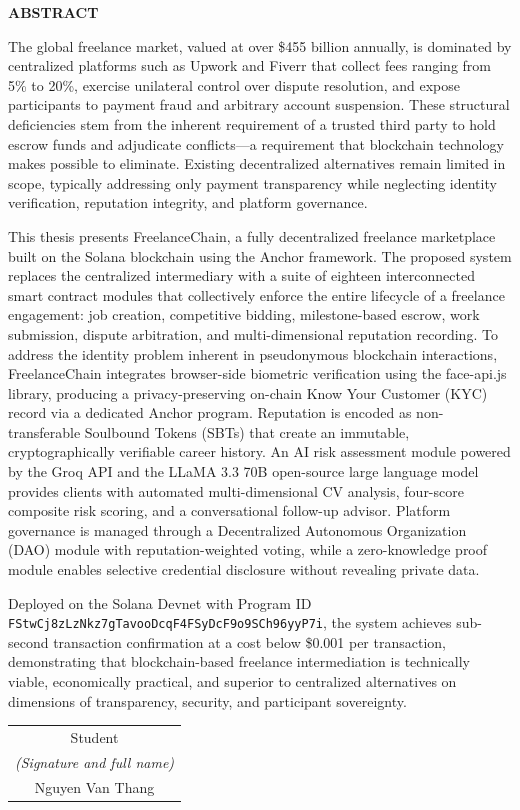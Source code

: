 \begin{center}
    \Large{\textbf{ABSTRACT}}
\end{center}
\vspace{1cm}

The global freelance market, valued at over \$455 billion annually, is dominated by centralized platforms such as Upwork and Fiverr that collect fees ranging from 5\% to 20\%, exercise unilateral control over dispute resolution, and expose participants to payment fraud and arbitrary account suspension. These structural deficiencies stem from the inherent requirement of a trusted third party to hold escrow funds and adjudicate conflicts---a requirement that blockchain technology makes possible to eliminate. Existing decentralized alternatives remain limited in scope, typically addressing only payment transparency while neglecting identity verification, reputation integrity, and platform governance.

This thesis presents FreelanceChain, a fully decentralized freelance marketplace built on the Solana blockchain using the Anchor framework. The proposed system replaces the centralized intermediary with a suite of eighteen interconnected smart contract modules that collectively enforce the entire lifecycle of a freelance engagement: job creation, competitive bidding, milestone-based escrow, work submission, dispute arbitration, and multi-dimensional reputation recording. To address the identity problem inherent in pseudonymous blockchain interactions, FreelanceChain integrates browser-side biometric verification using the face-api.js library, producing a privacy-preserving on-chain Know Your Customer (KYC) record via a dedicated Anchor program. Reputation is encoded as non-transferable Soulbound Tokens (SBTs) that create an immutable, cryptographically verifiable career history. An AI risk assessment module powered by the Groq API and the LLaMA 3.3 70B open-source large language model provides clients with automated multi-dimensional CV analysis, four-score composite risk scoring, and a conversational follow-up advisor. Platform governance is managed through a Decentralized Autonomous Organization (DAO) module with reputation-weighted voting, while a zero-knowledge proof module enables selective credential disclosure without revealing private data.

Deployed on the Solana Devnet with Program ID \texttt{FStwCj8zLzNkz7gTavooDcqF4FSyDcF9o9SCh96yyP7i}, the system achieves sub-second transaction confirmation at a cost below \$0.001 per transaction, demonstrating that blockchain-based freelance intermediation is technically viable, economically practical, and superior to centralized alternatives on dimensions of transparency, security, and participant sovereignty.

\begin{flushright}
\begin{tabular}{@{}c@{}}
Student\\
\textit{(Signature and full name)}\\[1cm]
Nguyen Van Thang
\end{tabular}
\end{flushright}
